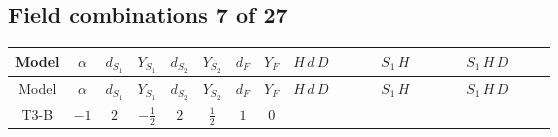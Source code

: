 \documentclass[8pt]{article}
\begin{document}
\begin{landscape}
\subsection*{Field combinations 7 of 27}
\begin{longtable}{@{}cccccccc >{\raggedright\arraybackslash}p{0.21\linewidth} >{\raggedright\arraybackslash}p{0.21\linewidth} >{\raggedright\arraybackslash}p{0.21\linewidth}@{}}
\toprule
Model & $\alpha$ & $d_{S_1}$ & $Y_{S_1}$ & $d_{S_2}$ & $Y_{S_2}$ & $d_F$ & $Y_F$ & $H\,d\,D$ & $S_1\,H$ & $S_1\,H\,D$ \\
\midrule
\endfirsthead
\toprule
Model & $\alpha$ & $d_{S_1}$ & $Y_{S_1}$ & $d_{S_2}$ & $Y_{S_2}$ & $d_F$ & $Y_F$ & $H\,d\,D$ & $S_1\,H$ & $S_1\,H\,D$ \\
\midrule
\endhead
T3-B & $-1$ & $2$ & $-\frac{1}{2}$ & $2$ & $\frac{1}{2}$ & $1$ & $0$ & \scriptsize\adjustbox{max width=\linewidth}{$\begin{gathered} -\frac{i \hbar  \overline{d_{\alpha _1,i_2}}\, \gamma ^{\mu _1}\, P_R\, d_{\alpha _1,i_2} g_1^4 H_{a_1} D_{\mu _1}\left(H_{a_1}\right){}^{\dagger }}{360 m_1^2} \\ +\frac{i \hbar  \overline{d_{\alpha _1,i_2}}\, \gamma ^{\mu _1}\, P_R\, d_{\alpha _1,i_2} g_1^4 H_{a_1}{}^{\dagger } D_{\mu _1}\left(H_{a_1}\right)}{360 m_1^2}\end{gathered}$} & \scriptsize\adjustbox{max width=\linewidth}{$\begin{gathered} +\frac{\hbar  H_{a_1} H_{a_2} H_{a_3} H_{a_1}{}^{\dagger } H_{a_2}{}^{\dagger } H_{a_3}{}^{\dagger } \left(\lambda_{HS_1}^{(1)}^{(1)}\right){}^3}{6 m_1^2} \\ +\frac{\hbar  H_{a_1} H_{a_2} H_{a_3} H_{a_1}{}^{\dagger } H_{a_2}{}^{\dagger } H_{a_3}{}^{\dagger } \left(\lambda_{HS_1}^{(1)}^{(2)}\right){}^3}{2 \sqrt{3} m_1^2} \\ +\frac{\hbar  H_{a_1} H_{a_2} H_{a_1}{}^{\dagger } H_{a_2}{}^{\dagger } \left(\lambda_{HS_1}^{(1)}^{(1)}\right){}^2}{2 \epsilon }\end{gathered}$} & \scriptsize\adjustbox{max width=\linewidth}{$\begin{gathered} -\frac{2 \hbar  H_{a_2} H_{a_2}{}^{\dagger } \left(\lambda_{HS_1}^{(1)}^{(2)}\right){}^2 D_{\mu _1}\left(H_{a_1}\right){}^{\dagger } D_{\mu _1}\left(H_{a_1}\right)}{9 m_1^2} \\ -\frac{2 \hbar  H_{a_2} H_{a_2}{}^{\dagger } \lambda_{HS_1}^{(1)}^{(1)} \lambda_{HS_1}^{(1)}^{(2)} D_{\mu _1}\left(H_{a_1}\right){}^{\dagger } D_{\mu _1}\left(H_{a_1}\right)}{3 \sqrt{3} m_1^2} \\ -\frac{\hbar  H_{a_2} H_{a_1}{}^{\dagger } \left(\lambda_{HS_1}^{(1)}^{(1)}\right){}^2 D_{\mu _1}\left(H_{a_2}\right){}^{\dagger } D_{\mu _1}\left(H_{a_1}\right)}{6 m_1^2}\end{gathered}$} \\

\end{longtable}
\end{landscape}
\end{document}
